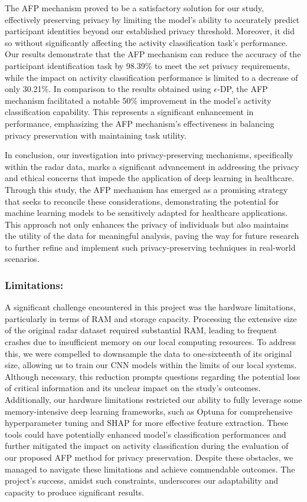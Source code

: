 \documentclass{l4proj}
\begin{document}
The AFP mechanism proved to be a satisfactory solution for our study, effectively preserving privacy by limiting the model's ability to accurately predict participant identities beyond our established privacy threshold. Moreover, it did so without significantly affecting the activity classification task's performance. Our results demonstrate that the AFP mechanism can reduce the accuracy of the participant identification task by 98.39\% to meet the set privacy requirements, while the impact on activity classification performance is limited to a decrease of only 30.21\%. In comparison to the results obtained using $\epsilon$-DP, the AFP mechanism facilitated a notable 50\% improvement in the model's activity classification capability. This represents a significant enhancement in performance, emphasizing the AFP mechanism's effectiveness in balancing privacy preservation with maintaining task utility.

In conclusion, our investigation into privacy-preserving mechanisms, specifically within the radar data, marks a significant advancement in addressing the privacy and ethical concerns that impede the application of deep learning in healthcare. Through this study, the AFP mechanism has emerged as a promising strategy that seeks to reconcile these considerations, demonstrating the potential for machine learning models to be sensitively adapted for healthcare applications. This approach not only enhances the privacy of individuals but also maintains the utility of the data for meaningful analysis, paving the way for future research to further refine and implement such privacy-preserving techniques in real-world scenarios.

\subsubsection{Limitations:}
A significant challenge encountered in this project was the hardware limitations, particularly in terms of RAM and storage capacity. Processing the extensive size of the original radar dataset required substantial RAM, leading to frequent crashes due to insufficient memory on our local computing resources. To address this, we were compelled to downsample the data to one-sixteenth of its original size, allowing us to train our CNN models within the limits of our local systems. Although necessary, this reduction prompts questions regarding the potential loss of critical information and its unclear impact on the study's outcomes. Additionally, our hardware limitations restricted our ability to fully leverage some memory-intensive deep learning frameworks, such as Optuna for comprehensive hyperparameter tuning and SHAP for more effective feature extraction. These tools could have potentially enhanced model's classification performances and further mitigated the impact on activity classification during the evaluation of our proposed AFP method for privacy preservation. Despite these obstacles, we managed to navigate these limitations and achieve commendable outcomes. The project's success, amidst such constraints, underscores our adaptability and capacity to produce significant results.
\end{document}
